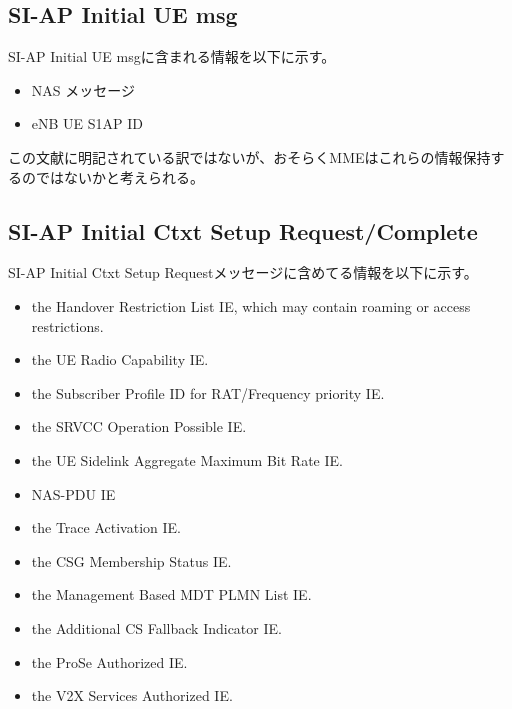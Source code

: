 \documentclass[a4j]{ujarticle}
\begin{document}
\subsection{SI-AP Initial UE msg}
SI-AP Initial UE msgに含まれる情報を以下に示す。
\begin{itemize}
  \item NAS メッセージ
  \item eNB UE S1AP ID
\end{itemize}
この文献に明記されている訳ではないが、おそらくMMEはこれらの情報保持するのではないかと考えられる。


\subsection{SI-AP Initial Ctxt Setup Request/Complete}
SI-AP Initial Ctxt Setup Requestメッセージに含めてる情報を以下に示す。
\begin{itemize}
  \item the Handover Restriction List IE, which may contain roaming or access restrictions.
  \item the UE Radio Capability IE.
  \item the Subscriber Profile ID for RAT/Frequency priority IE.
  \item the SRVCC Operation Possible IE.
  \item the UE Sidelink Aggregate Maximum Bit Rate IE.
  \item NAS-PDU IE
  \item the Trace Activation IE.
  \item the CSG Membership Status IE.
  \item the Management Based MDT PLMN List IE.
  \item the Additional CS Fallback Indicator IE.
  \item the ProSe Authorized IE.
  \item the V2X Services Authorized IE.
\end{itemize}
\end{document}
